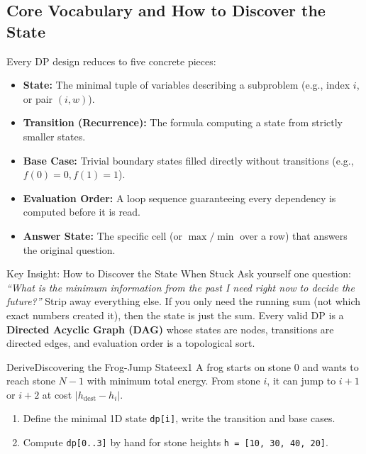 \documentclass[11pt,a4paper]{article}
\theoremstyle{definition}
\begin{document}
\subsection{Core Vocabulary and How to Discover the State}

Every DP design reduces to five concrete pieces:

\begin{itemize}
    \item \textbf{State:} The minimal tuple of variables describing a subproblem (e.g., index $i$, or pair $(i, w)$).
    \item \textbf{Transition (Recurrence):} The formula computing a state from strictly smaller states.
    \item \textbf{Base Case:} Trivial boundary states filled directly without transitions (e.g., $f(0) = 0, f(1) = 1$).
    \item \textbf{Evaluation Order:} A loop sequence guaranteeing every dependency is computed before it is read.
    \item \textbf{Answer State:} The specific cell (or $\max/\min$ over a row) that answers the original question.
\end{itemize}

\begin{calloutbox}{Key Insight: How to Discover the State When Stuck}
Ask yourself one question: \emph{``What is the minimum information from the past I need right now to decide the future?''} Strip away everything else. If you only need the running sum (not which exact numbers created it), then the state is just the sum. Every valid DP is a \textbf{Directed Acyclic Graph (DAG)} whose states are nodes, transitions are directed edges, and evaluation order is a topological sort.
\end{calloutbox}

\begin{tryitbox}{Derive}{Discovering the Frog-Jump State}{ex1}
A frog starts on stone $0$ and wants to reach stone $N-1$ with minimum total energy. From stone $i$, it can jump to $i + 1$ or $i + 2$ at cost $|h_{\text{dest}} - h_i|$.
\begin{enumerate}
    \item Define the minimal 1D state \texttt{dp[i]}, write the transition and base cases.
    \item Compute \texttt{dp[0..3]} by hand for stone heights \texttt{h = [10, 30, 40, 20]}.
\end{enumerate}
\end{tryitbox}
\end{document}
